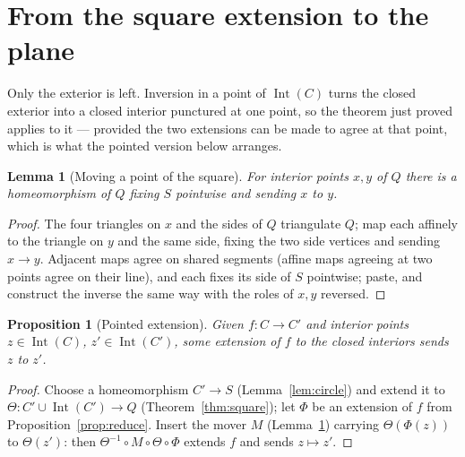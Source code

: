 \documentclass[11pt,a4paper]{article}
\theoremstyle{jsplain}
\newtheorem{lemma}[theorem]{Lemma}
\newtheorem{proposition}[theorem]{Proposition}
\theoremstyle{jsdefn}
\newcommand{\Int}{\operatorname{Int}}
\begin{document}
\section{From the square extension to the plane}\label{sec:plane}

Only the exterior is left. Inversion in a point of $\Int(C)$ turns the
closed exterior into a closed interior punctured at one point, so the
theorem just proved applies to it --- provided the two extensions can be
made to agree at that point, which is what the pointed version below
arranges.

\begin{lemma}[Moving a point of the square]\label{lem:mover}
For interior points $x,y$ of $Q$ there is a homeomorphism of $Q$
fixing $S$ pointwise and sending $x$ to $y$.
\end{lemma}
\begin{proof}
The four triangles on $x$ and the sides of $Q$ triangulate $Q$; map
each affinely to the triangle on $y$ and the same side, fixing the two
side vertices and sending $x\to y$. Adjacent maps agree on shared
segments (affine maps agreeing at two points agree on their line), and
each fixes its side of $S$ pointwise; paste, and construct the inverse
the same way with the roles of $x,y$ reversed.
\end{proof}

\begin{proposition}[Pointed extension]\label{prop:pointed}
Given $f:C\to C'$ and interior points $z\in\Int(C)$,
$z'\in\Int(C')$, some extension of $f$ to the closed interiors sends
$z$ to $z'$.
\end{proposition}
\begin{proof}
Choose a homeomorphism $C'\to S$ (Lemma~\ref{lem:circle}) and extend
it to $\Theta:C'\cup\Int(C')\to Q$ (Theorem~\ref{thm:square}); let
$\Phi$ be an extension of $f$ from Proposition~\ref{prop:reduce}.
Insert the mover $M$ (Lemma~\ref{lem:mover}) carrying $\Theta(\Phi(z))$
to $\Theta(z')$: then $\Theta^{-1}\circ M\circ\Theta\circ\Phi$ extends
$f$ and sends $z\mapsto z'$.
\end{proof}
\end{document}
